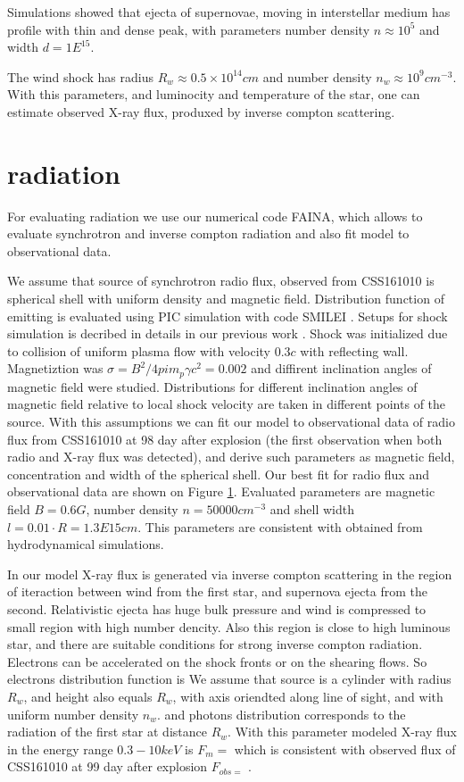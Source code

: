 \documentclass[a4paper,12pt]{extreport}
\begin{document}
Simulations showed that ejecta of supernovae, moving in interstellar medium has profile with thin and dense peak, with parameters number density $n \approx 10^5$ and width $d = 1E^{15}$.


The wind shock has radius $R_w \approx 0.5\times10^14 cm$ and number density $n_w \approx 10^9 cm^{-3}$. With this parameters, and luminocity and temperature of the star, one can estimate observed X-ray flux, produxed by inverse compton scattering. 
\section{radiation}
For evaluating radiation we use our numerical code FAINA, which allows to evaluate synchrotron and inverse compton radiation and also fit model to observational data. 

We assume that source of synchrotron radio flux, observed from CSS161010 is spherical shell with uniform density and magnetic field. Distribution function of emitting is evaluated using PIC simulation with code SMILEI \cite{Derouillat}. Setups for shock simulation is decribed in details in our previous work \cite{BykovUniverse}. Shock was initialized due to collision of uniform plasma flow with velocity $0.3 c$ with reflecting wall. Magnetiztion was $\sigma = B^2/4 pi m_p \gamma c^2 = 0.002$ and diffirent inclination angles of magnetic field were studied. Distributions for different inclination angles of magnetic field relative to local shock velocity are taken in different points of the source. With this assumptions we can fit our model to observational data of radio flux from CSS161010 at 98 day after explosion (the first observation when both radio and X-ray flux was detected), and derive such parameters as magnetic field, concentration and width of the spherical shell. Our best fit for radio flux and observational data are shown on Figure \ref{}. Evaluated parameters are magnetic field $B = 0.6 G$, number density $n = 50000{cm}^{-3}$ and shell width $l = 0.01\cdot R = 1.3E15 cm$. This parameters are consistent with obtained from hydrodynamical simulations.

In our model X-ray flux is generated via inverse compton scattering in the region of iteraction between wind from the first star, and supernova ejecta from the second. Relativistic ejecta has huge bulk pressure and wind is compressed to small region with high number dencity. Also this region is close to high luminous star, and there are suitable conditions for strong inverse compton radiation. Electrons can be accelerated on the shock fronts or on the shearing flows. So electrons distribution function is 
We assume that source is a cylinder with radius $R_w$, and height also equals $R_w$, with axis oriendted along line of sight, and with uniform number density $n_w$. 
and photons distribution corresponds to the radiation of the first star at distance $R_w$. With this parameter modeled X-ray flux in the energy range $0.3-10 keV$ is $F_m = $ which is consistent with observed flux of CSS161010 at 99 day after explosion $F_{obs = }$ \cite{Coppejans2020}.



\end{document}
